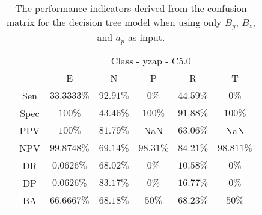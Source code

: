 \begin{table}[!ht]
	\centering
	\begin{tabular}{|c|c|c|c|c|c|c|}
		\cline{3-7}
		\multicolumn{2}{c|}{} & \multicolumn{5}{c|}{Class - yzap - C5.0} \\ \cline{3-7}
		\multicolumn{2}{c|}{} & E & N & P & R & T \\ \hline
		\multirow{7}{*}{\rotatebox{90}{Statistics}} & Sen & $33.3333\%$ & $92.91\%$ & $0\%$ & $44.59\%$ & $0\%$ \\ \cline{2-7}
		 & Spec & $100\%$ & $43.46\%$ & $100\%$ & $91.88\%$ & $100\%$ \\ \cline{2-7}
		 & PPV & $100\%$ & $81.79\%$ & NaN & $63.06\%$ & NaN \\ \cline{2-7}
		 & NPV & $99.8748\%$ & $69.14\%$ & $98.31\%$ & $84.21\%$ & $98.811\%$ \\ \cline{2-7}
		 & DR & $0.0626\%$ & $68.02\%$ & $0\%$ & $10.58\%$ & $0\%$ \\ \cline{2-7}
		 & DP & $0.0626\%$ & $83.17\%$ & $0\%$ & $16.77\%$ & $0\%$ \\ \cline{2-7}
		 & BA & $66.6667\%$ & $68.18\%$ & $50\%$ & $68.23\%$ & $50\%$ \\ \hline
	\end{tabular}
	\caption{The performance indicators derived from the confusion matrix for the decision tree model when using only $B_{y}$, $B_{z}$, and $a_{p}$ as input.}
	\label{tab:cs:reverse:yzap:C5.0}
\end{table}
